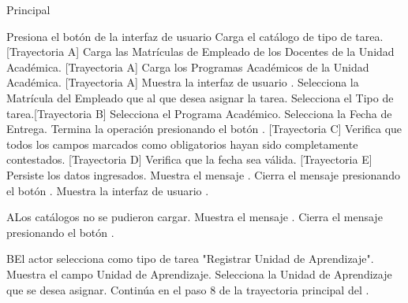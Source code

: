 \begin{UCtrayectoria}{Principal}

    \UCpaso[\UCactor] Presiona el botón  de la interfaz de usuario 
    \UCpaso Carga el catálogo de tipo de tarea. [Trayectoria A]
    \UCpaso Carga las Matrículas de Empleado de los Docentes de la Unidad Académica. [Trayectoria A]
    \UCpaso Carga los Programas Académicos de la Unidad Académica. [Trayectoria A]
    \UCpaso Muestra la interfaz de usuario .
    \UCpaso[\UCactor] Selecciona la Matrícula del Empleado que al que desea asignar la tarea.
    \UCpaso[\UCactor] Selecciona el Tipo de tarea.[Trayectoria B]
    \UCpaso[\UCactor] Selecciona el Programa Académico.
    \UCpaso[\UCactor] Selecciona la Fecha de Entrega.
    \UCpaso[\UCactor] Termina la operación presionando el botón . [Trayectoria C]
    \UCpaso Verifica que todos los campos marcados como obligatorios hayan sido completamente contestados. [Trayectoria D]
    \UCpaso Verifica que la fecha sea válida. [Trayectoria E]
    \UCpaso Persiste los datos ingresados.
    \UCpaso Muestra el mensaje .
    \UCpaso[\UCactor] Cierra el mensaje presionando el botón .
    \UCpaso Muestra la interfaz de usuario .
\end{UCtrayectoria}


\begin{UCtrayectoriaA}{A}{Los catálogos no se pudieron cargar.}
    \UCpaso Muestra el mensaje .
    \UCpaso[\UCactor] Cierra el mensaje presionando el botón .
\end{UCtrayectoriaA}


\begin{UCtrayectoriaA}{B}{El actor selecciona como tipo de tarea "Registrar Unidad de Aprendizaje".}
    \UCpaso Muestra el campo Unidad de Aprendizaje.
    \UCpaso[\UCactor] Selecciona la Unidad de Aprendizaje que se desea asignar.
    \UCpaso Continúa en el paso 8 de la trayectoria principal del .
\end{UCtrayectoriaA}

